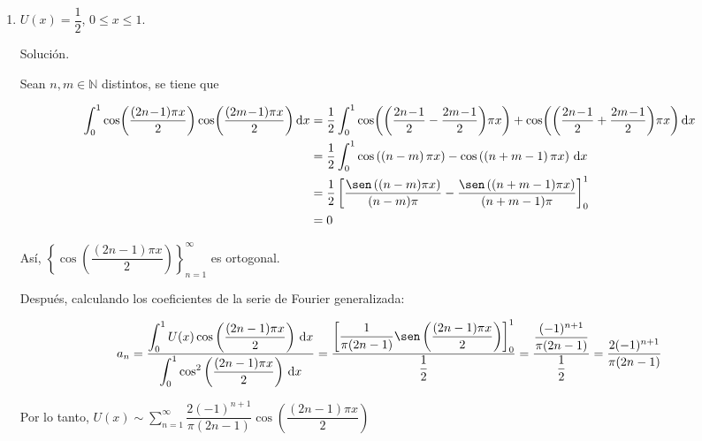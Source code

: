 \documentclass[fleqn]{article}
\newcommand{\nat}{\mathbb{N}}
\newcommand{\integ}[3]{\displaystyle \int_{#1}^{#2} #3 \, \mathrm{d} x}
\begin{document}
\begin{enumerate}[I.]
		\begin{enumerate}
			\item $ U(x) = \dfrac{1}{2} $, $ 0 \leq x \leq 1 $.
			
			Solución.
			
			\normalfont

			Sean $ n, m \in \nat $ distintos, se tiene que

            \begin{align*}
                \integ{0}{1}{\cos \! \left( \dfrac{(2n \! - \! 1) \pi x}{2} \right) \cos \! \left( \dfrac{(2m \! - \! 1) \pi x}{2} \right) \! } &= \dfrac{1}{2}\integ{0}{1}{ \cos \! \left( \left( \dfrac{2n \! - \! 1}{2} - \dfrac{2m \! - \! 1}{2} \right) \! \pi x \right) + \cos \! \left( \left(\dfrac{2n \! - \! 1}{2} + \dfrac{2m \! - \! 1}{2} \right) \! \pi x \right) \! } \\
                &= \dfrac{1}{2} \integ{0}{1}{ \cos \left( \left( n - m \right) \pi x \right) - \cos \left( \left( n + m - 1 \right) \pi x \right) } \\
                &= \dfrac{1}{2} \left[ \dfrac{\sen \left( (n - m) \pi x \right)}{(n - m) \pi} - \dfrac{\sen \left( (n + m - 1) \pi x \right)}{(n + m - 1) \pi} \right]_{0}^{1} \\
                &= 0
            \end{align*}

            Así, $ \left\lbrace \cos \left( \dfrac{(2n - 1) \pi x}{2} \right) \right\rbrace_{n=1}^{\infty} $ es ortogonal.

            Después, calculando los coeficientes de la serie de Fourier generalizada:

            \begin{align*}
                a_n = \dfrac{\integ{0}{1}{U(x) \cos \left( \dfrac{(2n - 1) \pi x}{2} \right)}}{\integ{0}{1}{\cos^2 \left( \dfrac{(2n- 1) \pi x}{2} \right)}} 
                = \dfrac{\left[ \dfrac{1}{\pi (2n - 1)} \sen \left( \dfrac{(2n - 1) \pi x}{2} \right) \right]_{0}^{1}}{\dfrac{1}{2}} 
                = \dfrac{\dfrac{(-1)^{n+1}}{\pi (2n - 1)}}{\dfrac{1}{2}} 
                = \dfrac{2(-1)^{n+1}}{\pi (2n - 1)}
            \end{align*}

            Por lo tanto, $ U(x) \sim \displaystyle \sum_{n=1}^{\infty} \dfrac{2(-1)^{n+1}}{\pi (2n - 1)} \cos \left( \dfrac{(2n - 1) \pi x}{2} \right) $ \vspace{3mm}


\end{enumerate}
\end{enumerate}
\end{document}

